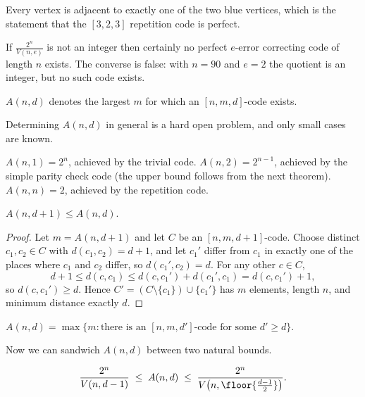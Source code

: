 Every vertex is adjacent to exactly one of the two blue vertices, which is the statement that the $[3,2,3]$ repetition code is perfect.

\begin{remark}
	If $\frac{2^n}{V(n,e)}$ is not an integer then certainly no perfect $e$-error correcting code of length $n$ exists. The converse is false: with $n = 90$ and $e = 2$ the quotient is an integer, but no such code exists.
\end{remark}

\begin{definition}
	$A(n,d)$ denotes the largest $m$ for which an $[n,m,d]$-code exists.
\end{definition}

Determining $A(n,d)$ in general is a hard open problem, and only small cases are known.

\begin{example}
	$A(n,1) = 2^n$, achieved by the trivial code. $A(n,2) = 2^{n-1}$, achieved by the simple parity check code (the upper bound follows from the next theorem). $A(n,n) = 2$, achieved by the repetition code.
\end{example}

\begin{lemma}\label{lem:Amono}
	$A(n,d+1) \le A(n,d)$.
\end{lemma}

\begin{proof}
	Let $m = A(n,d+1)$ and let $C$ be an $[n,m,d+1]$-code. Choose distinct $c_1, c_2 \in C$ with $d(c_1,c_2) = d+1$, and let $c_1'$ differ from $c_1$ in exactly one of the places where $c_1$ and $c_2$ differ, so $d(c_1',c_2) = d$. For any other $c \in C$,
	$$d+1 \le d(c,c_1) \le d(c,c_1') + d(c_1',c_1) = d(c,c_1') + 1,$$
	so $d(c,c_1') \ge d$. Hence $C' = (C \setminus \{c_1\})\cup\{c_1'\}$ has $m$ elements, length $n$, and minimum distance exactly $d$.
\end{proof}

\begin{corollary}
	$A(n,d) = \max\{m : \text{there is an } [n,m,d'] \text{-code for some } d' \ge d\}$.
\end{corollary}

Now we can sandwich $A(n,d)$ between two natural bounds.

\begin{theorem}\label{thm:gsv}
	$$\frac{2^n}{V(n,d-1)} \;\le\; A(n,d) \;\le\; \frac{2^n}{V\bigl(n,\floor{\frac{d-1}{2}}\bigr)}.$$
\end{theorem}

